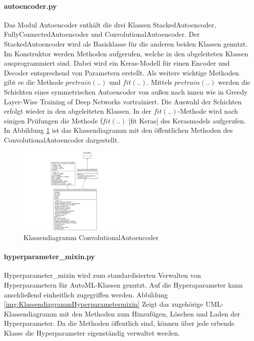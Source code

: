 	\paragraph{autoencoder.py} Das Modul Autoencoder enthält die drei Klassen StackedAutoencoder, FullyConnectedAutoencoder und ConvolutionalAutoencoder. Der StackedAutoencoder wird als Basisklasse für die anderen beiden Klassen genutzt. Im Konstruktor werden Methoden aufgerufen, welche in den abgeleiteten Klassen ausprogrammiert sind. Dabei wird ein Keras-Modell für einen Encoder und Decoder entsprechend von Parametern erstellt. Als weitere wichtige Methoden gibt es die Methode $pretrain(..)$ und $fit(..)$. Mittels $pretrain(..)$ werden die Schichten eines symmetrischen Autoencoder von außen nach innen wie in  Greedy Layer-Wise Training of Deep Networks vortrainiert. Die Auswahl der Schichten erfolgt wieder in den abgeleiteten Klassen.
	In der $fit(..)$-Methode wird nach einigen Prüfungen die Methode f$fit(..)$ 		[fit Keras] des Kerasmodels aufgerufen. In Abbildung \ref{img:KlassendiagrammConvolutionalAutoencoder} ist das Klassendiagramm mit den öffentlichen Methoden des ConvolutionalAutoencoder dargestellt. 
	\begin{figure}[h]
		\centering
		\includegraphics[width=0.5\textwidth, center]{bilder/Klassendiagramme/klassendiagramm_public_cae.png}
		\caption[Klassendiagramm ConvolutionalAutoencoder]{Klassendiagramm ConvolutionalAutoencoder}
		\label{img:KlassendiagrammConvolutionalAutoencoder}
	\end{figure}  
	
	\paragraph{hyperparameter\_mixin.py}  Hyperparameter\_mixin wird zum standardisierten Verwalten von Hyperparametern für AutoML-Klassen genutzt. Auf die Hyperaparameter kann anschließend einheitlich zugegriffen werden. Abbildung \ref{img:KlassendiagrammHyperparametermixin}  Zeigt das zugehörige UML-Klassendiagramm mit den Methoden zum Hinzufügen, Löschen und Laden der Hyperparameter. Da die Methoden öffentlich sind, können über jede erbende Klasse die Hyperparameter eigenständig verwaltet werden.
	
